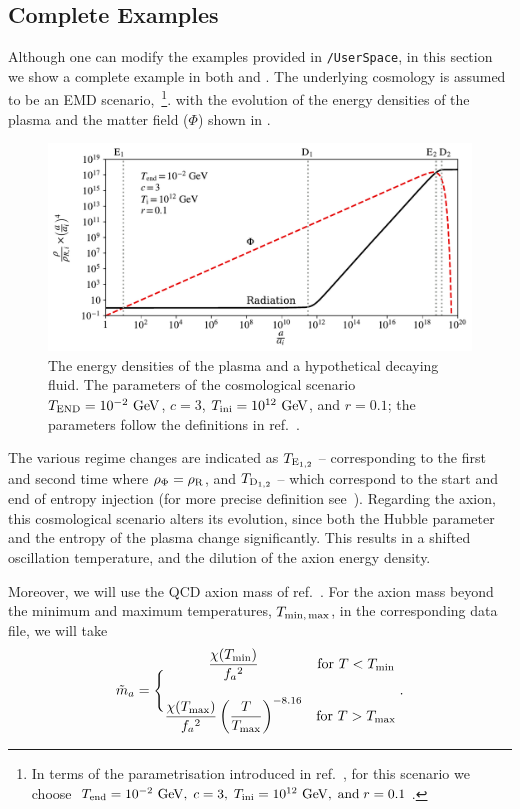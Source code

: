 \documentclass[11pt,a4paper]{article}
\begin{document}
\subsection{Complete Examples}\label{sec:complete_examples}
%
Although one can modify the examples provided in {\tt \mimes/UserSpace}, in this section we show a complete example in both \CPP and \PY. 
%
The underlying cosmology is assumed to be an EMD scenario,~\footnote{In terms of the parametrisation introduced in ref.~\cite{Arias:2019uol,Arias:2020qty},  for this scenario we choose $T_{\rm end}=10^{-2} ~{\rm GeV},\; c=3, \; T_{\rm ini}=10^{12} ~{\rm GeV}, \; \text{and}\; r=0.1$.}.
%
with the evolution of the energy densities of the plasma and the matter field ($\Phi$) shown in .
%
\begin{figure}[t]
	\includegraphics[width=1\textwidth]{energy_densities.pdf}
	\caption{The energy densities of the plasma and a hypothetical decaying fluid. The parameters of the cosmological scenario  $T_{\rm END}=10^{-2}~{\rm GeV}$, $c=3$, $T_{\rm ini}=10^{12}~{\rm GeV}$, and $r=0.1$; the parameters  follow the definitions in ref.~\cite{Arias:2020qty}. }
	\label{fig:energy_densities}
\end{figure}
%
The various regime changes are indicated as $T_{{\rm E}_{1,2}}$ -- corresponding to the first and second time where $\rho_{\Phi} = \rho_{\rm R}$,  and $T_{{\rm D}_{1,2}}$ -- which correspond to the start and end of entropy injection (for more precise definition see~\cite{Arias:2020qty}). Regarding the axion, this cosmological scenario alters its evolution, since both the Hubble parameter and the entropy of the plasma change significantly. This results in a shifted oscillation temperature, and the dilution of the axion energy density.

Moreover, we will use the QCD axion mass of ref.~\cite{Borsanyi:2016ksw}. For the axion mass beyond the minimum and maximum temperatures, $T_{\rm min, \, max}$, in the corresponding data file, we will take
%
\begin{equation}
	\tilde m_{a}{} = \Bigg\{
	\begin{matrix}
		\dfrac{\chi(T_{\rm min})}{f_{a}{}^2} & \text{for } T<T_{\rm min} 
		\\ \\
		\dfrac{\chi(T_{\rm max})}{f_{a}{}^2}   \left( \dfrac{T}{T_{\rm max}} \right)^{-8.16} & \text{for } T>T_{\rm max} 
	\end{matrix} \;.
	\label{eq:axM-limits}
\end{equation}
\end{document}
